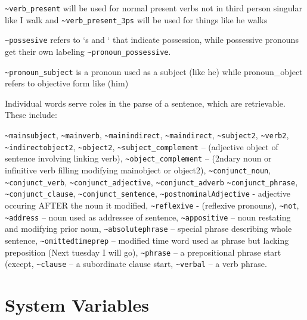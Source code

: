 \documentclass[]{article}
\begin{document}
\texttt{\textasciitilde{}verb\_present} will be used for normal present
verbs not in third person singular like I walk and
\texttt{\textasciitilde{}verb\_present\_3ps} will be used for things
like he walks

\texttt{\textasciitilde{}possesive} refers to `s and ` that indicate
possession, while possessive pronouns get their own labeling
\texttt{\textasciitilde{}pronoun\_possessive}.

\texttt{\textasciitilde{}pronoun\_subject} is a pronoun used as a
subject (like he) while pronoun\_object refers to objective form like
(him)

Individual words serve roles in the parse of a sentence, which are
retrievable. These include:

\texttt{\textasciitilde{}mainsubject},
\texttt{\textasciitilde{}mainverb},
\texttt{\textasciitilde{}mainindirect},
\texttt{\textasciitilde{}maindirect},
\texttt{\textasciitilde{}subject2}, \texttt{\textasciitilde{}verb2},
\texttt{\textasciitilde{}indirectobject2},
\texttt{\textasciitilde{}object2},
\texttt{\textasciitilde{}subject\_complement} -- (adjective object of
sentence involving linking verb),
\texttt{\textasciitilde{}object\_complement} -- (2ndary noun or
infinitive verb filling modifying mainobject or object2),
\texttt{\textasciitilde{}conjunct\_noun},
\texttt{\textasciitilde{}conjunct\_verb},
\texttt{\textasciitilde{}conjunct\_adjective},
\texttt{\textasciitilde{}conjunct\_adverb}
\texttt{\textasciitilde{}conjunct\_phrase},
\texttt{\textasciitilde{}conjunct\_clause},
\texttt{\textasciitilde{}conjunct\_sentence},
\texttt{\textasciitilde{}postnominalAdjective} - adjective occuring
AFTER the noun it modified, \texttt{\textasciitilde{}reflexive} -
(reflexive pronouns), \texttt{\textasciitilde{}not},
\texttt{\textasciitilde{}address} -- noun used as addressee of sentence,
\texttt{\textasciitilde{}appositive} -- noun restating and modifying
prior noun, \texttt{\textasciitilde{}absolutephrase} -- special phrase
describing whole sentence, \texttt{\textasciitilde{}omittedtimeprep} --
modified time word used as phrase but lacking preposition (Next tuesday
I will go), \texttt{\textasciitilde{}phrase} -- a prepositional phrase
start (except, \texttt{\textasciitilde{}clause} -- a subordinate clause
start, \texttt{\textasciitilde{}verbal} -- a verb phrase.

\section{System Variables}\label{system-variables}
\end{document}
